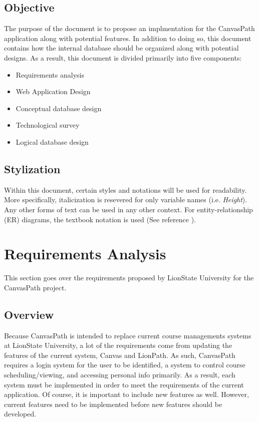 \documentclass{article}
\begin{document}
  \subsection{Objective}\label{sec:Introduction:Objective}
    The purpose of the document is to propose an implmentation for the CanvasPath application along with potential features.  In addition to doing so, this document contains how the internal database should be organized along with potential designs.  As a result, this document is divided primarily into five components:
    \begin{itemize}
      \item Requirements analysis
      \item Web Application Design
      \item Conceptual database design
      \item Technological survey
      \item Logical database design
    \end{itemize}

  \medskip

  \subsection{Stylization}\label{sec:Introduction:Stylization}
    Within this document, certain styles and notations will be used for readability.  More specifically, italicization is resevered for only variable names (i.e. \textit{Height}).  Any other forms of text can be used in any other context.  For entity-relationship (ER) diagrams, the textbook notation is used (See reference \cite{textbook}).

  \newpage


  \section{Requirements Analysis}\label{sec:Requirements}
    This section goes over the requirements proposed by LionState University for the CanvasPath project.

  \subsection{Overview}\label{sec:Requrements:Overview}
    Because CanvasPath is intended to replace current course managements systems at LionState University, a lot of the requirements come from updating the features of the current system, Canvas and LionPath.  As such, CanvasPath requires a login system for the user to be identified, a system to control course scheduling/viewing, and accessing personal info primarily.  As a result, each system must be implemented in order to meet the requirements of the current application.  Of course, it is important to include new features as well.  However, current features need to be implemented before new features should be developed.
\end{document}
